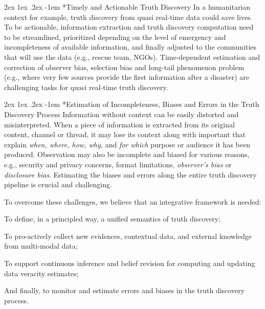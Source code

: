 \documentclass[prodmode,acmtecs]{acmsmall} %
\makeatletter
\renewcommand\paragraph{\@startsection{paragraph}{5}{\z@}%
                                       {2ex \@plus1ex \@minus .2ex}%
                                       {-1em}%
                                      {\sffamily\normalsize\bfseries}}
\makeatother
\begin{document}
\paragraph*{Timely and Actionable Truth Discovery} 
In a humanitarian context for example, truth discovery from quasi real-time data could save lives. To be actionable, information extraction and 
truth discovery computation need to be streamlined, prioritized depending on the level of emergency and incompleteness of available information,
and finally adjusted to the communities that will 
use the data (e.g., rescue team, NGOs). Time-dependent estimation and correction of observer bias, selection bias and long-tail phenomenon problem
(e.g., where very few sources provide the first information after a disaster) are challenging tasks for quasi real-time truth discovery.
\vspace*{-0.23cm}

\paragraph*{Estimation of Incompleteness, Biases and Errors in the Truth Discovery Process}  
Information without context can be easily distorted and misinterpreted.
When a piece of information is extracted from its original 
content, channel or thread, it may lose its context along with important 
 that explain \emph{when, where, how, why,} and
\emph{for which} purpose or audience it has been produced. Observation may also be incomplete and biased for various 
reasons, e.g., security and privacy concerns, format limitations, \emph{observer's bias} or \emph{disclosure bias}. 
Estimating the biases and errors along the entire truth discovery pipeline is crucial and challenging.
%

To overcome these challenges, we believe that an integrative framework is needed:
\begin{inparaenum}[(i)]
\item To define, in a principled way, a unified semantics of truth discovery;
\item To pro-actively collect new evidences, contextual data, and external knowledge from multi-modal data; 
\item To support continuous inference and belief revision for computing and updating data veracity estimates;
\item And finally, to monitor and estimate errors and biases in the truth discovery process.
\end{inparaenum}
\end{document}
